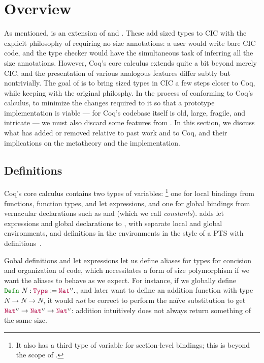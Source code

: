 \section{Overview}\label{sec:overview} %

As mentioned, \lang is an extension of \CIChat and \CIChatminus.
These add sized types to CIC with the explicit philosophy of requiring no size annotations:
a user would write bare CIC code, and the type checker would have the simultaneous task of inferring all the size annotations.
However, Coq's core calculus extends quite a bit beyond merely CIC,
and the presentation of various analogous features differ subtly but nontrivially.
The goal of \lang is to bring sized types in CIC a few steps closer to Coq,
while keeping with the original philosphy.
In the process of conforming to Coq's calculus, to minimize the changes required to it so that a prototype implementation is viable --- for Coq's codebase itself is old, large, fragile, and intricate --- we must also discard some features from \CIChatminus.
In this section, we discuss what \lang has added or removed relative to past work and to Coq,
and their implications on the metatheory and the implementation.

\subsection{Definitions}

Coq's core calculus contains two types of variables:%
\footnote{It also has a third type of variable for section-level bindings;
this is beyond the scope of \lang.}
one for local bindings from functions, function types, and let expressions,
and one for global bindings from vernacular declarations such as  and  (which we call \textit{constants}).
\lang adds let expressions and global declarations to \CIChatminus,
with separate local and global environments,
and definitions in the environments in the style of a PTS with definitions~\citep{ptsdef}.

Gobal definitions and let expressions let us define aliases for types for concision and organization of code,
which necessitates a form of size polymorphism if we want the aliases to behave as we expect.
For instance, if we globally define $\Defn{N}{\Type{}}{\Nat^\upsilon}$,
and later want to define an addition function with type $N \rightarrow N \rightarrow N$,
it would \emph{not} be correct to perform the na\"ive substitution to get $\Nat^\upsilon \rightarrow \Nat^\upsilon \rightarrow \Nat^\upsilon$:
addition intuitively does not always return something of the same size.

